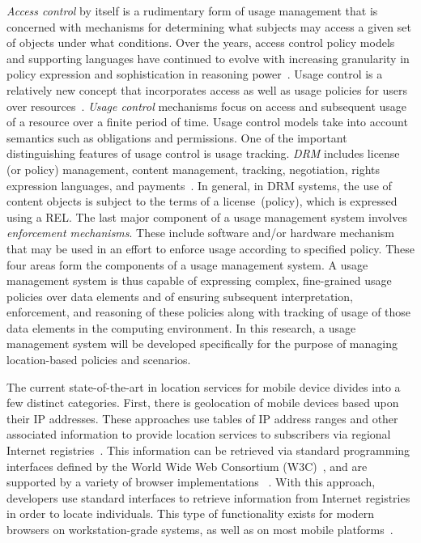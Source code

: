 \documentclass{sbir}
\begin{document}
\emph{Access control} by itself is a rudimentary form of usage management that is concerned with mechanisms for determining what subjects may access a given set of objects under what conditions. Over the years, access control policy models and supporting languages have continued to evolve with increasing granularity in policy expression and sophistication in reasoning power~\cite{BlPa:76,HuFeKu:06}. Usage control is a relatively new concept that incorporates access as well as usage policies for users over resources~\cite{PaSa:04}. \emph{Usage control} mechanisms focus on access and subsequent usage of a resource over a finite period of time. Usage control models take into account semantics such as obligations and permissions. One of the important distinguishing features of usage control is usage tracking. \emph{DRM} includes license (or policy) management, content management, tracking, negotiation, rights expression languages, and payments~\cite{HeJaKhHr:07,JaHe:08b,JaHeMa:06}. In general, in DRM systems, the use of content objects is subject to the terms of a license~(policy), which is expressed using a REL. The last major component of a usage management system involves \emph{enforcement mechanisms}. These include software and/or hardware mechanism that may be used in an effort to enforce usage according to specified policy.
These four areas form the components of a usage management system. A usage management system is thus capable of expressing complex, fine-grained usage policies over data elements and of ensuring subsequent interpretation, enforcement, and reasoning of these policies along with tracking of usage of those data elements in the computing environment. In this research, a usage management system will be developed specifically for the purpose of managing location-based policies and scenarios. 

The current state-of-the-art in location services for mobile device divides into a few distinct categories. First, there is geolocation of mobile devices based upon their IP addresses. These approaches use tables of IP address ranges and other associated information to provide location services to subscribers via regional Internet registries~\cite{AIRN:13,RIPE:13}. This information can be retrieved via standard programming interfaces defined by the World Wide Web Consortium (W3C)~\cite{w3c:13}, and are supported by a variety of browser implementations ~\cite{firefox:13,Pi:13}. With this approach, developers use standard interfaces to retrieve information from Internet registries in order to locate individuals. This type of functionality exists for modern browsers on workstation-grade systems, as well as on most mobile platforms~\cite{opera:13,safari:13}.
\end{document}
